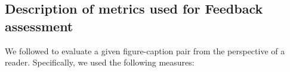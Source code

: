 \documentclass[11pt]{article}
\renewcommand{\cite}[1]{\citep{#1}}
\begin{document}





 \subsection{Description of metrics used for Feedback assessment}

We followed \cite{summaries-as-captions-preprint} to evaluate a given figure-caption pair from the perspective of a reader. Specifically, we used the following measures:
\end{document}
